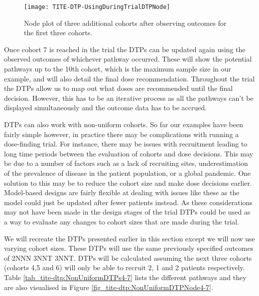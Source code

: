 \begin{figure}[h!]
	\centering
	\caption[DTP node plot for three additional cohorts.]{Node plot of three additional cohorts after observing outcomes for the first three cohorts.}
	\label{fig_tite-dtp:UsingDuringTrialDTPNode4-7}
	\texttt{[image: TITE-DTP-UsingDuringTrialDTPNode]}
\end{figure}

Once cohort 7 is reached in the trial the DTPs can be updated again using the observed outcomes of whichever pathway occurred. These will show the potential pathways up to the 10th cohort, which is the maximum sample size in our example, and will also detail the final dose recommendation. Throughout the trial the DTPs allow us to map out what doses are recommended until the final decision. However, this has to be an iterative process as all the pathways can't be displayed simultaneously and the outcome data has to be accrued. 

DTPs can also work with non-uniform cohorts. So far our examples have been fairly simple however, in practice there may be complications with running a dose-finding trial. For instance, there may be issues with recruitment leading to long time periods between the evaluation of cohorts and dose decisions. This may be due to a number of factors such as a lack of recruiting sites, underestimation of the prevalence of disease in the patient population, or a global pandemic. One solution to this may be to reduce the cohort size and make dose decisions earlier. Model-based designs are fairly flexible at dealing with issues like these as the model could just be updated after fewer patients instead. As these considerations may not have been made in the design stages of the trial DTPs could be used as a way to evaluate any changes to cohort sizes that are made during the trial. 

We will recreate the DTPs presented earlier in this section except we will now use varying cohort sizes. These DTPs will use the same previously specified outcomes of 2NNN 3NNT 3NNT. DTPs will be calculated assuming the next three cohorts (cohorts 4,5 and 6) will only be able to recruit 2, 1 and 2 patients respectively. Table \ref{tab_tite-dtp:NonUniformDTPs4-7} lists the different pathways and they are also visualised in Figure \ref{fig_tite-dtp:NonUniformDTPNode4-7}. 

